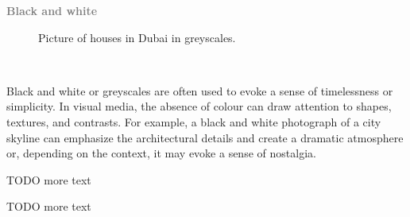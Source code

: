 \documentclass[../MasterThesis.tex]{subfiles}
\begin{document}

\textbf{\textcolor{gray}{Black and white}}


\begin{minipage}{0.5\textwidth}
	\begin{figure}[H]
	\begin{center}
		\label{figure:gray}
		\caption[Picture of a houses in Dubai in greyscales.]{Picture of houses in Dubai in greyscales.}
	\end{center}
\end{figure}\hfill
\end{minipage}\begin{minipage}{0.05\textwidth}
	\ 
\end{minipage}\begin{minipage}{0.45\textwidth}
	Black and white or greyscales are often used to evoke a sense of timelessness or simplicity. In visual media, the absence of colour can draw attention to shapes, textures, and contrasts. For example, a black and white photograph of a city skyline can emphasize the architectural details and create a dramatic atmosphere or, depending on the context, it may evoke a sense of nostalgia.
	
	TODO more text
	
	TODO more text
	
\end{minipage}

%





\end{document}
